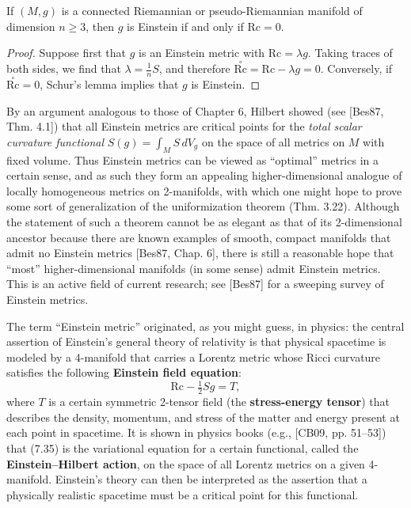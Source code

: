 \begin{corollary}
\label{cor:einstein-zero-ricci}
If $(M,g)$ is a connected Riemannian or pseudo-Riemannian manifold of dimension $n \geq 3$, then $g$ is Einstein if and only if $\mathrm{Rc} = 0$.
\end{corollary}

\begin{proof}
Suppose first that $g$ is an Einstein metric with $\mathrm{Rc} = \lambda g$. Taking traces of both sides, we find that $\lambda = \frac{1}{n}S$, and therefore $\stackrel{\circ}{\mathrm{Rc}} = \mathrm{Rc} - \lambda g = 0$. Conversely, if $\stackrel{\circ}{\mathrm{Rc}} = 0$, Schur's lemma implies that $g$ is Einstein.
\end{proof}

By an argument analogous to those of Chapter 6, Hilbert showed (see [Bes87, Thm. 4.1]) that all Einstein metrics are critical points for the \emph{total scalar curvature functional} $S(g) = \int_M S \, dV_g$ on the space of all metrics on $M$ with fixed volume. Thus Einstein metrics can be viewed as ``optimal'' metrics in a certain sense, and as such they form an appealing higher-dimensional analogue of locally homogeneous metrics on 2-manifolds, with which one might hope to prove some sort of generalization of the uniformization theorem (Thm. 3.22). Although the statement of such a theorem cannot be as elegant as that of its 2-dimensional ancestor because there are known examples of smooth, compact manifolds that admit no Einstein metrics [Bes87, Chap. 6], there is still a reasonable hope that ``most'' higher-dimensional manifolds (in some sense) admit Einstein metrics. This is an active field of current research; see [Bes87] for a sweeping survey of Einstein metrics.

The term ``Einstein metric'' originated, as you might guess, in physics: the central assertion of Einstein's general theory of relativity is that physical spacetime is modeled by a 4-manifold that carries a Lorentz metric whose Ricci curvature satisfies the following \textbf{Einstein field equation}:
\begin{equation}
\mathrm{Rc} - \tfrac{1}{2}Sg = T,
\tag{7.35}
\end{equation}
where $T$ is a certain symmetric 2-tensor field (the \textbf{stress-energy tensor}) that describes the density, momentum, and stress of the matter and energy present at each point in spacetime. It is shown in physics books (e.g., [CB09, pp. 51--53]) that (7.35) is the variational equation for a certain functional, called the \textbf{Einstein--Hilbert action}, on the space of all Lorentz metrics on a given 4-manifold. Einstein's theory can then be interpreted as the assertion that a physically realistic spacetime must be a critical point for this functional.

